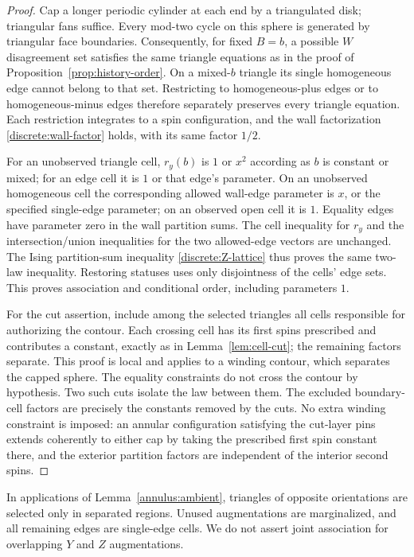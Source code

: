 \begin{proof}
Cap a longer periodic cylinder at each end by a triangulated disk;
triangular fans suffice. Every mod-two cycle on this sphere is generated
by triangular face boundaries. Consequently, for fixed $B=b$, a possible
$W$ disagreement set satisfies the same triangle equations as in the proof
of Proposition~\ref{prop:history-order}. On a mixed-$b$ triangle its
single homogeneous edge cannot belong to that set. Restricting to
homogeneous-plus edges or to homogeneous-minus edges therefore separately
preserves every triangle equation. Each restriction integrates to a spin
configuration, and the wall factorization \eqref{discrete:wall-factor}
holds, with its same factor $1/2$.

For an unobserved triangle cell, $r_y(b)$ is $1$ or $x^2$ according as
$b$ is constant or mixed; for an edge cell it is $1$ or that edge's
parameter. On an unobserved homogeneous cell the corresponding allowed
wall-edge parameter is $x$, or the specified single-edge parameter;
on an observed open cell it is $1$. Equality edges have parameter zero
in the wall partition sums. The cell inequality for $r_y$ and the
intersection/union inequalities for the two allowed-edge vectors are
unchanged. The Ising partition-sum inequality
\eqref{discrete:Z-lattice} thus proves the same two-law inequality.
Restoring statuses uses only disjointness of the cells' edge sets.
This proves association and conditional order, including parameters $1$.

For the cut assertion, include among the selected triangles all cells
responsible for authorizing the contour. Each crossing cell has its first
spins prescribed and contributes a constant, exactly as in
Lemma~\ref{lem:cell-cut}; the remaining factors separate. This proof is
local and applies to a winding contour, which separates the capped sphere.
The equality constraints do not cross the contour by hypothesis.
Two such cuts isolate the law between them. The excluded boundary-cell
factors are precisely the constants removed by the cuts. No extra winding
constraint is imposed: an annular configuration satisfying the cut-layer
pins extends coherently to either cap by taking the prescribed first spin
constant there, and the exterior partition factors are independent of the
interior second spins.
\end{proof}

In applications of Lemma~\ref{annulus:ambient}, triangles of opposite
orientations are selected only in separated regions. Unused augmentations
are marginalized, and all remaining edges are single-edge cells. We do not
assert joint association for overlapping $Y$ and $Z$ augmentations.

